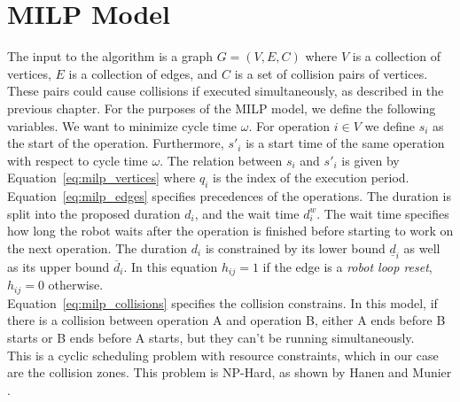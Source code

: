 \chapter{MILP Model}
\label{ch:milp_model}
\graphicspath{{chapters/MILP_Model/}}

The input to the algorithm is a graph \(G=(V, E, C)\) where \(V\) is a collection of vertices, $E$ is a collection of edges, and $C$ is a set of collision pairs of vertices. 
These pairs could cause collisions if executed simultaneously, as described in the previous chapter. 
For the purposes of the MILP model, we define the following variables. 
We want to minimize cycle time $\omega$. 
For operation $i \in V$ we define $s_i$ as the start of the operation.
Furthermore, $s'_i$ is a start time of the same operation with respect to cycle time $\omega$. 
The relation between $s_i$ and $s'_i$ is given by Equation~\ref{eq:milp_vertices} where $q_i$ is the index of the execution period. \\

Equation~\ref{eq:milp_edges} specifies precedences of the operations. 
The duration is split into the proposed duration $d_i$, and the wait time $d^w_i$. 
The wait time specifies how long the robot waits after the operation is finished before starting to work on the next operation.
The duration $d_i$ is constrained by its lower bound $\underline{d}_i$ as well as its upper bound $\overline{d}_i$. 
In this equation $h_{ij} = 1$ if the edge is a \emph{robot loop reset}, $h_{ij} = 0$ otherwise. \\

Equation~\ref{eq:milp_collisions} specifies the collision constrains. 
In this model, if there is a collision between operation A and operation B, either A ends before B starts or B ends before A starts, but they can't be running simultaneously. \\

This is a cyclic scheduling problem with resource constraints, which in our case are the collision zones.
This problem is NP-Hard, as shown by Hanen and Munier \cite{HanenMunierNPHardProof}. \\


